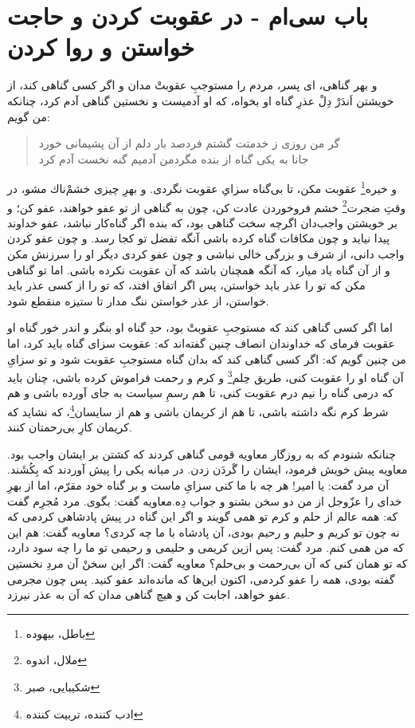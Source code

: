 \section*{باب سى‌ام - 
در عقوبت كردن و حاجت خواستن و روا كردن}

و بهر گناهى، اى پسر، مردم را مستوجبِ عقوبتْ مدان و اگر كسى گناهى كند، از خويشتن اَندَرْ دِلْ عذرِ گناه او بخواه، كه او آدميست و نخستين گناهى آدم كرد، چنانكه من گويم:

\begin{quote}
گر من روزى ز خدمتت گشتم فرد\quad \quad صد بار دلم از آن پشيمانى خورد \\
جانا به يكى گناه از بنده مگرد\quad \quad من آدميم گنه نخست آدم كرد
\end{quote}

و خيره\footnote{باطل، بیهوده} عقوبت مكن، تا بى‌گناه سزاىِ عقوبت نگردى. و بهرِ چيزى خشم‌ْناك مشو، در وقتِ ضجرت\footnote{ملال، اندوه} خشم فروخوردن عادت كن، چون به گناهى از تو عفو خواهند، عفو كن؛ و بر خويشتن واجب‌دان اگرچه سخت گناهى بود، كه بنده اگر گناه‌كار نباشد، عفو خداوند پيدا نيايد و چون مكافات گناه كرده باشى آنگه تفضل تو كجا رسد. و چون عفو كردن واجب دانى، از شرف و بزرگى خالى نباشى و چون عفو كردى ديگر او را سرزنش مكن و از آن گناه ياد ميار، كه آنگه همچنان باشد كه آن عقوبت نكرده باشى. اما تو گناهى مكن كه تو را عذر بايد خواستن، پس اگر اتفاق افتد، كه تو را از كسى عذر بايد خواستن، از عذر خواستن ننگ مدار تا ستيزه منقطع شود.

اما اگر كسى گناهى كند كه مستوجبِ عقوبتْ بود، حدِ گناه او بنگر و اندر خور گناه او عقوبت فرماى كه خداوندان انصاف چنين گفته‌اند كه: عقوبت سزاى گناه بايد كرد، اما من چنين گويم كه: اگر كسى گناهى كند كه بدان گناه مستوجبِ عقوبت شود و تو سزاىِ آن گناه او را عقوبت كنى، طريق حِلم\footnote{شکیبایی،‌ صبر} و كرم و رحمت فراموش كرده باشى، چنان بايد كه درمى گناه را نيم درم عقوبت كنى، تا هم رسمِ سياست به جاى آورده باشى و هم شرط كرم نگه داشته باشى، تا هم از كريمان باشى و هم از سايسان\footnote{ادب کننده،‌ تربیت کننده}، كه نشايد كه كريمان كارِ بى‌رحمتان كنند.

چنانكه شنودم كه به روزگار معاويه قومى گناهى كردند كه كشتن بر ايشان واجب بود. معاويه پيش خويش فرمود، ايشان را گَردَن زدن. در ميانه يكى را پيش آوردند كه بِكُشَند. آن مرد گفت: يا امير! هر چه با ما كنى سزاىِ ماست و بر گناه خود مقرّم، اما از بهرِ خداى را عزّوجل از من دو سخن بشنو و جواب دِه.معاويه گفت: بگوى. مرد مُجرِم گفت كه: همه عالم از حلم و كرم تو همى گويند و اگر اين گناه در پيش پادشاهى كردمى كه نه چون تو كريم و حليم و رحيم بودى، آن پادشاه با ما چه كردى‌؟ معاويه گفت: هم اين كه من همى كنم. مرد گفت: پس ازين كريمى و حليمى و رحيمى تو ما را چه سود دارد، كه تو همان كنى كه آن بى‌رحمت و بى‌حلم‌؟ معاويه گفت: اگر اين سخنْ آن مردِ نخستين گفته بودى، همه را عفو كردمى، اكنون اين‌ها كه مانده‌اند عفو كنيد. پس چون مجرمى عفو خواهد، اجابت كن و هيچ گناهى مدان كه آن به عذر نيرزد.


